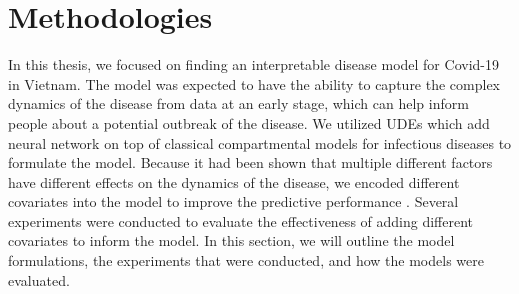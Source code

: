 \chapter{Methodologies}
\label{chap:methodologies}

In this thesis, we focused on finding an interpretable disease model for Covid-19 in Vietnam.
The model was expected to have the ability to capture the complex dynamics of the disease from data at an early stage, which can help inform people about a potential outbreak of the disease.
We utilized \glspl{UDE} which add neural network on top of classical compartmental models for infectious diseases to formulate the model.
Because it had been shown that multiple different factors have different effects on the dynamics of the disease, we encoded different covariates into the model to improve the predictive performance \cite{ihmecovid-19forecastingteamModelingCOVID19Scenarios2021,arikInterpretableSequenceLearning,}.
Several experiments were conducted to evaluate the effectiveness of adding different covariates to inform the model.
In this section, we will outline the model formulations, the experiments that were conducted, and how the models were evaluated.









% 

